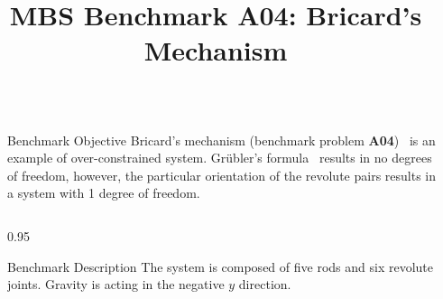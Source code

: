 \documentclass[final]{beamer}
\title{MBS Benchmark A04: Bricard's Mechanism} %
\newlength{\sepwid}
\newlength{\onecolwid}
\newlength{\twocolwid}
\begin{document}

\setlength{\belowcaptionskip}{2ex} %
\setlength\belowdisplayshortskip{2ex} %

\begin{frame}[t] %

\begin{columns}[t] %

\begin{column}{\sepwid}\end{column} %

\begin{column}{\twocolwid} %


\begin{alertblock}{Benchmark Objective}
Bricard's mechanism (benchmark problem \textbf{A04})~\cite{bricard1897memorie} is an example of over-constrained system. 
Gr\"{u}bler's formula~\cite{grubler1884allgemeine} results in no degrees of freedom, however, the particular orientation of the revolute pairs results in a system with 1 degree of freedom.
\end{alertblock}








\begin{columns}[t, totalwidth=\twocolwid]

\begin{column}{0.95\onecolwid}
\begin{block}{Benchmark Description}
The system is composed of five rods and six revolute joints. Gravity is acting in the negative $y$ direction.


\end{block}
\end{column}
\end{columns}
\end{column}
\end{columns}
\end{frame}
\end{document}
